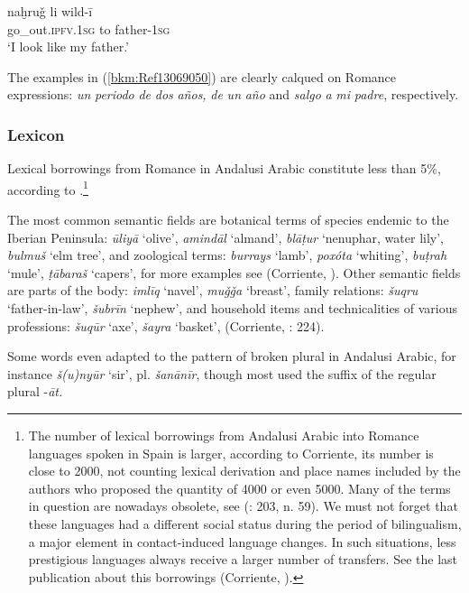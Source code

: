 \documentclass[output=paper,modfonts,nonflat]{langsci/langscibook}
\begin{document}
\ex\label{ex:key:}
\gll naḫruǧ li wild-ī\\
  go\_out.\textsc{ipfv.1sg} to father-\textsc{1sg}\\
\glt ‘I look like my father.’
\z
\z

The examples in (\ref{bkm:Ref13069050}) are clearly calqued on Romance expressions: \textit{un} \textit{periodo} \textit{de} \textit{dos} \textit{años,} \textit{de} \textit{un} \textit{año} and \textit{salgo} \textit{a} \textit{mi} \textit{padre}, respectively. 
 
\subsubsection{Lexicon}




Lexical borrowings from Romance in Andalusi Arabic constitute less than 5\%, according to \citep[142]{Corriente1992}.\footnote{The number of lexical borrowings from Andalusi Arabic into Romance languages spoken in Spain is larger, {according to Corriente, its number is close to 2000, not counting lexical derivation and place names included by the authors who proposed the quantity of 4000 or even 5000.} Many of the terms in question are nowadays obsolete, see (\citealt{Corriente2005}: 203, n. 59). We must not forget that these languages had a different social status during the period of bilingualism, a major element in contact-induced language changes. In such situations, less prestigious languages always receive a larger number of transfers. See the last publication about this borrowings (Corriente, \citealt{PereiraVicente2019}).} 

The most common semantic fields are botanical terms of species endemic to the Iberian Peninsula: \textit{ūliyā} ‘olive’, \textit{amindāl} ‘almand’, \textit{blāṭur} ‘nenuphar, water lily’, \textit{bulmuš} ‘elm tree’, and zoological terms: \textit{burrays} ‘lamb’, \textit{poxóta} ‘whiting’, \textit{buṭrah} ‘mule’, \textit{ṭābaraš} ‘capers’, for more examples see (Corriente, \citealt{PereiraVicente2017}). Other semantic fields are parts of the body: \textit{imlīq}  ‘navel’, \textit{muǧǧa} ‘breast’, family relations: \textit{šuqru} ‘father-in-law’, \textit{šubrīn} ‘nephew’, and household items and technicalities of various professions: \textit{šuqūr} ‘axe’, \textit{šayra} ‘basket’, (Corriente, \citealt{PereiraVicente2015}: 224). 

Some words even adapted to the pattern of broken plural in Andalusi Arabic, for instance \textit{š(u)nyūr} ‘sir’, pl. \textit{šanānīr}, though most used the suffix of the regular plural -\textit{āt.}
\end{document}
